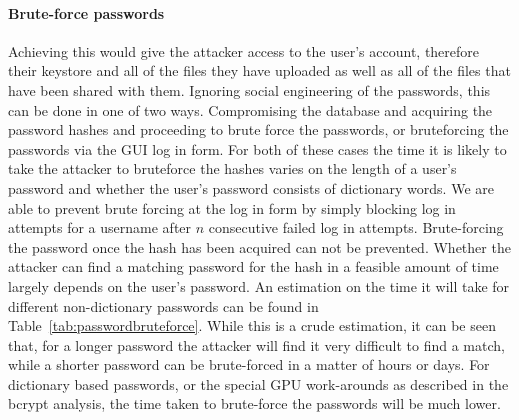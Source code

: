 \documentclass[12pt, titlepage]{article}
\begin{document}
\paragraph*{Brute-force passwords} Achieving this would give the attacker access to the user's account, therefore their keystore and all of the files they have uploaded as well as all of the files that have been shared with them. Ignoring social engineering of the passwords, this can be done in one of two ways. Compromising the database and acquiring the password hashes and proceeding to brute force the passwords, or bruteforcing the passwords via the GUI log in form. For both of these cases the time it is likely to take the attacker to bruteforce the hashes varies on the length of a user's password and whether the user's password consists of dictionary words. We are able to prevent brute forcing at the log in form by simply blocking log in attempts for a username after $n$ consecutive failed log in attempts. Brute-forcing the password once the hash has been acquired can not be prevented. Whether the attacker can find a matching password for the hash in a feasible amount of time largely depends on the user's password. An estimation on the time it will take for different non-dictionary passwords can be found in Table~\ref{tab:passwordbruteforce}. While this is a crude estimation, it can be seen that, for a longer password the attacker will find it very difficult to find a match, while a shorter password can be brute-forced in a matter of hours or days. For dictionary based passwords, or the special GPU work-arounds as described in the bcrypt analysis, the time taken to brute-force the passwords will be much lower.
\end{document}
